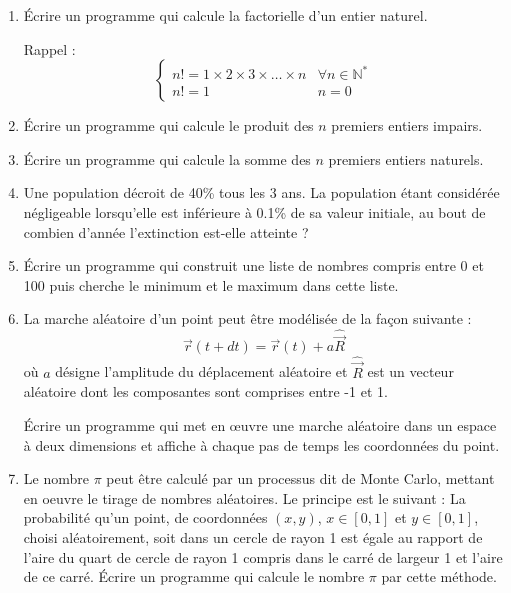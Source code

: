 \begin{enumerate}
    \item Écrire un programme qui calcule la factorielle d'un entier naturel.
    
    Rappel :
    \begin{equation*}
        \begin{cases}
            n! = 1 \times 2 \times 3 \times \ldots \times n & \forall n \in \mathbb{N}^* \\
            n! = 1 & n = 0
        \end{cases}
    \end{equation*}
    
    \item Écrire un programme qui calcule le produit des $n$ premiers entiers impairs.
    
    \item Écrire un programme qui calcule la somme des $n$ premiers entiers naturels.
    
    \item Une population décroit de 40\% tous les 3 ans. La population étant considérée négligeable lorsqu'elle est inférieure à 0.1\% de sa valeur initiale, au bout de combien d'année l'extinction est-elle atteinte ?
    
    \item Écrire un programme qui construit une liste de nombres compris entre 0 et 100 puis cherche le minimum et le maximum dans cette liste.
    
    \item La marche aléatoire d'un point peut être modélisée de la façon suivante : 
    \begin{equation*}
        \vec{r}(t + dt) = \vec{r}(t) + a \hat{\vec{R}}
    \end{equation*}
    où $a$ désigne l'amplitude du déplacement aléatoire et $\hat{\vec{R}}$ est un vecteur aléatoire dont les composantes sont comprises entre -1 et 1.
    
    Écrire un programme qui met en œuvre une marche aléatoire dans un espace à deux dimensions et affiche à chaque pas de temps les coordonnées du point.

    \item Le nombre $\pi$ peut être calculé par un processus dit de Monte Carlo, mettant en oeuvre le tirage de nombres aléatoires. Le principe est le suivant : La probabilité qu'un point, de coordonnées $(x, y)$, $x\in[0,1]$ et $y\in[0,1]$, choisi aléatoirement, soit dans un cercle de rayon 1 est égale au rapport de l'aire du quart de cercle de rayon 1 compris dans le carré de largeur 1 et l'aire de ce carré. Écrire un programme qui calcule le nombre $\pi$ par cette méthode.
    

\end{enumerate}
